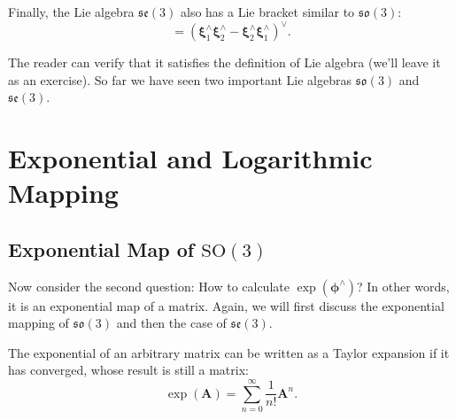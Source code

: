 Finally, the Lie algebra $\mathfrak{se}(3)$ also has a Lie bracket similar to $\mathfrak{so}(3)$:
\begin{equation}
[ \boldsymbol{\xi}_1, \boldsymbol{\xi}_2 ] = \left( \boldsymbol{\xi}_1^\wedge \boldsymbol{\xi}_2^\wedge -\boldsymbol{\xi}_2^ \wedge \boldsymbol{\xi}_1^\wedge \right) ^\vee.
\end{equation}

The reader can verify that it satisfies the definition of Lie algebra (we'll leave it as an exercise). So far we have seen two important Lie algebras $\mathfrak{so}(3)$ and $\mathfrak{se}(3)$.

\section{Exponential and Logarithmic Mapping}
\subsection{Exponential Map of $\mathrm{SO}(3)$}

Now consider the second question: How to calculate $\exp ( \boldsymbol{\phi}^{\wedge} )$? In other words, it is an exponential map of a matrix. Again, we will first discuss the exponential mapping of $\mathfrak{so}(3)$ and then the case of $\mathfrak{se}(3)$.

The exponential of an arbitrary matrix can be written as a Taylor expansion if it has converged, whose result is still a matrix:
\begin{equation}
\exp(\mathbf{A}) = \sum\limits_{n = 0}^\infty {\frac{1}{{n!}}{ \mathbf{A}^n}}.
\end{equation}

